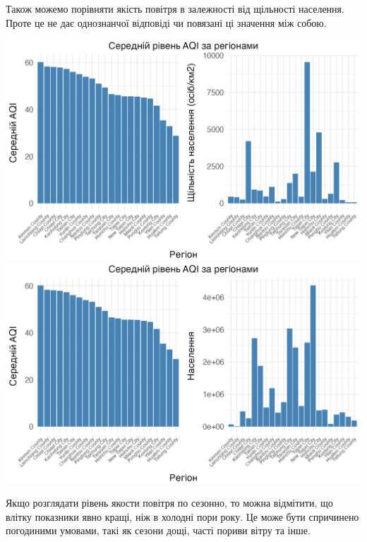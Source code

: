 \documentclass{article}
\begin{document}
\begin{enumerate}
    Також можемо порівняти якість повітря в залежності від щільності населення. Проте це не дає однознанчої відповіді чи повязані ці значення між собою.
    \begin{center}
    \includegraphics[width=6in]{plots/question4/avg_aqi_by_county_w_dens.png}
    \includegraphics[width=6in]{plots/question4/avg_aqi_by_county_w_pop.png}
    \end{center}

    Якщо розглядати рівень якости повітря по сезонно, то можна відмітити, що влітку показники явно кращі, ніж в холодні пори року. Це може бути спричинено погодиними умовами, такі як сезони дощі, часті пориви вітру та інше.
    

\end{enumerate}
\end{document}
